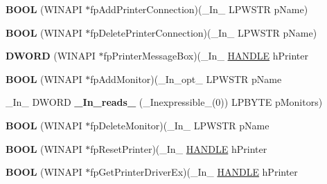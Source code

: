 \begin{DoxyCompactItemize}
{\bfseries B\+O\+OL} (W\+I\+N\+A\+PI $\ast$fp\+Add\+Printer\+Connection)(\+\_\+\+In\+\_\+ L\+P\+W\+S\+TR p\+Name)
\item 
\mbox{\label{struct___p_r_i_n_t_p_r_o_v_i_d_o_r_a5de43251fc1d7f3c6e3094478ac947d7}} 
{\bfseries B\+O\+OL} (W\+I\+N\+A\+PI $\ast$fp\+Delete\+Printer\+Connection)(\+\_\+\+In\+\_\+ L\+P\+W\+S\+TR p\+Name)
\item 
\mbox{\label{struct___p_r_i_n_t_p_r_o_v_i_d_o_r_a5dfb1f6fc3d879cba918b3e1a2fe62b4}} 
{\bfseries D\+W\+O\+RD} (W\+I\+N\+A\+PI $\ast$fp\+Printer\+Message\+Box)(\+\_\+\+In\+\_\+ \hyperlink{interfacevoid}{H\+A\+N\+D\+LE} h\+Printer
\item 
\mbox{\label{struct___p_r_i_n_t_p_r_o_v_i_d_o_r_a209724b173e9d02bd5a5734132faa9d5}} 
{\bfseries B\+O\+OL} (W\+I\+N\+A\+PI $\ast$fp\+Add\+Monitor)(\+\_\+\+In\+\_\+opt\+\_\+ L\+P\+W\+S\+TR p\+Name
\item 
\mbox{\label{struct___p_r_i_n_t_p_r_o_v_i_d_o_r_a2df61738815b1e4dc07cedaeca1f8324}} 
\+\_\+\+In\+\_\+ D\+W\+O\+RD {\bfseries \+\_\+\+In\+\_\+reads\+\_\+} (\+\_\+\+Inexpressible\+\_\+(0)) L\+P\+B\+Y\+TE p\+Monitors)
\item 
\mbox{\label{struct___p_r_i_n_t_p_r_o_v_i_d_o_r_a798e951bbbdb25f245163ddb53de9c6f}} 
{\bfseries B\+O\+OL} (W\+I\+N\+A\+PI $\ast$fp\+Delete\+Monitor)(\+\_\+\+In\+\_\+ L\+P\+W\+S\+TR p\+Name
\item 
\mbox{\label{struct___p_r_i_n_t_p_r_o_v_i_d_o_r_a5919924f9c4cbd93a5470e012b396185}} 
{\bfseries B\+O\+OL} (W\+I\+N\+A\+PI $\ast$fp\+Reset\+Printer)(\+\_\+\+In\+\_\+ \hyperlink{interfacevoid}{H\+A\+N\+D\+LE} h\+Printer
\item 
\mbox{\label{struct___p_r_i_n_t_p_r_o_v_i_d_o_r_a7df2745fc02951b816dd8c11a54e741d}} 
{\bfseries B\+O\+OL} (W\+I\+N\+A\+PI $\ast$fp\+Get\+Printer\+Driver\+Ex)(\+\_\+\+In\+\_\+ \hyperlink{interfacevoid}{H\+A\+N\+D\+LE} h\+Printer
\item 
\mbox{\label{struct___p_r_i_n_t_p_r_o_v_i_d_o_r_ab6a7f3660ac0daf3ae5a1728e3b191f9}} 

\end{DoxyCompactItemize}
